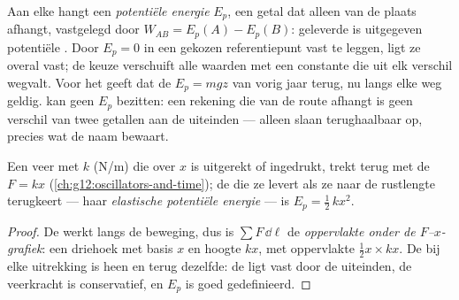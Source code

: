 \begin{definition}\label{def:g12:work-and-energy:ep}
Aan elke  hangt een \emph{potentiële
energie} $E_p$, een getal
dat alleen van de plaats afhangt, vastgelegd door
$W_{AB} = E_p(A) - E_p(B)$: geleverde  is uitgegeven potentiële
. Door $E_p = 0$ in een gekozen referentiepunt vast te leggen, ligt ze
overal vast; de keuze verschuift alle waarden met een constante die uit elk
verschil wegvalt. Voor het  geeft dat de $E_p = mgz$ van vorig jaar
terug, nu langs elke weg geldig.  kan geen $E_p$ bezitten: een
rekening die van de route afhangt is geen verschil van twee getallen aan de
uiteinden --- alleen  slaan terughaalbaar op, precies
wat de naam bewaart.
\end{definition}

\begin{proposition}\label{prop:g12:work-and-energy:elastic}
Een veer met  $k$ (\unit{N/m}) die over $x$ is uitgerekt of
ingedrukt, trekt terug met de  $F = kx$
(\cref{ch:g12:oscillators-and-time}); de  die ze levert als ze naar de
rustlengte terugkeert --- haar \emph{elastische potentiële
energie} --- is $E_p = \tfrac12\, k x^2$.
\end{proposition}

\begin{proof}
De  werkt langs de beweging, dus is $\sum F\,\dd\ell$ de
\emph{oppervlakte onder de $F$--$x$-grafiek}: een driehoek met basis $x$ en
hoogte $kx$, met oppervlakte $\tfrac12 x \times kx$. De  bij elke
uitrekking is heen en terug dezelfde: de  ligt vast door de uiteinden,
de veerkracht is conservatief, en $E_p$ is goed gedefinieerd.
\end{proof}

